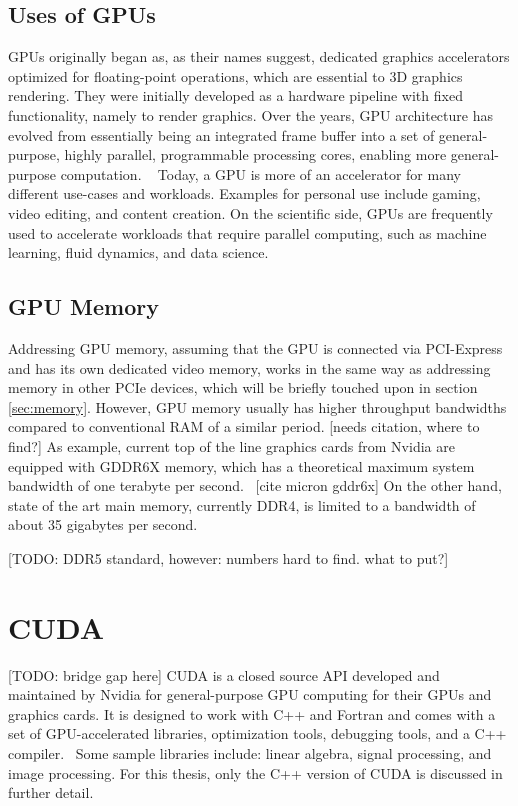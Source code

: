  \subsection{Uses of GPUs}
 
 GPUs originally began as, as their names suggest, dedicated graphics accelerators optimized for floating-point operations, which are essential to 3D graphics rendering. They were initially developed as a hardware pipeline with fixed functionality, namely to render graphics. Over the years, GPU architecture has evolved from essentially being an integrated frame buffer into a set of general-purpose, highly parallel, programmable processing cores, enabling more general-purpose computation. ~\parencite{mcclanahan_history_2010} Today, a GPU is more of an accelerator for many different use-cases and workloads. Examples for personal use include gaming, video editing, and content creation. \cite{intel_what_nodate} On the scientific side, GPUs are frequently used to accelerate workloads that require parallel computing, such as machine learning, fluid dynamics, and data science. \cite{nvidia_cuda_2017}
 
 
 \subsection{GPU Memory}
 Addressing GPU memory, assuming that the GPU is connected via PCI-Express and has its own dedicated video memory, works in the same way as addressing memory in other PCIe devices, which will be briefly touched upon in section \ref{sec:memory}. However, GPU memory usually has higher throughput bandwidths compared to conventional RAM of a similar period. [needs citation, where to find?] As example, current top of the line graphics cards from Nvidia are equipped with GDDR6X memory, which has a theoretical maximum system bandwidth of one terabyte per second.~\cite{nvidia_nvidia_nodate} [cite micron gddr6x] On the other hand, state of the art main memory, currently DDR4, is limited to a bandwidth of about 35 gigabytes per second.~\cite{micron_technology_inc_ram_nodate}
 
 [TODO: DDR5 standard, however: numbers hard to find. what to put?]
 
 
 \section{CUDA}
 [TODO: bridge gap here]
 CUDA is a closed source API developed and maintained by Nvidia for general-purpose GPU computing for their GPUs and graphics cards. It is designed to work with C++ and Fortran and comes with a set of GPU-accelerated libraries, optimization tools, debugging tools, and a C++ compiler.~\parencite{nvidia_cuda_2017} Some sample libraries include: linear algebra, signal processing, and image processing. \parencite{nvidia_cuda_2020} For this thesis, only the C++ version of CUDA is discussed in further detail.
 
